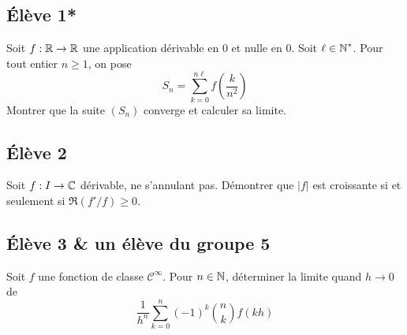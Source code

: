 \documentclass[10pt]{scrartcl}
\title{}
\author{}
\date{}
\begin{document}
    \subsection*{Élève 1*}
    \begin{exo}
        Soit $f:\operatorname{\mathbb R}\to\operatorname{\mathbb R}$ une application dérivable en $0$ et nulle en $0$. 
        Soit $\ell\in\operatorname{\mathbb N}^*$. Pour tout entier $n\geq 1$, on pose 
        \[
            S_n=\sum_{k=0}^{n\ell}f\left(\frac k{n^2}\right)
        \]
        Montrer que la suite $(S_n)$ converge et calculer sa limite.
    \end{exo}
    
    \subsection*{Élève 2}
    \begin{exo}
        Soit $f:I\to\operatorname{\mathbb C}$ dérivable, ne s'annulant pas. 
        Démontrer que $|f|$ est croissante si et seulement si 
        $\Re(f'/f)\geq 0$.
    \end{exo}

    \subsection*{Élève 3 & un élève du groupe 5}
    \begin{exo}
        Soit $f$ une fonction de classe $\mathcal C^\infty$.
        Pour $n\in\operatorname{\mathbb N}$, déterminer la limite quand $h\to0$ de 
        \[
            \frac1{h^n}\sum_{k=0}^n(-1)^k\binom nkf(kh)
        \]
    \end{exo}
\end{document}
